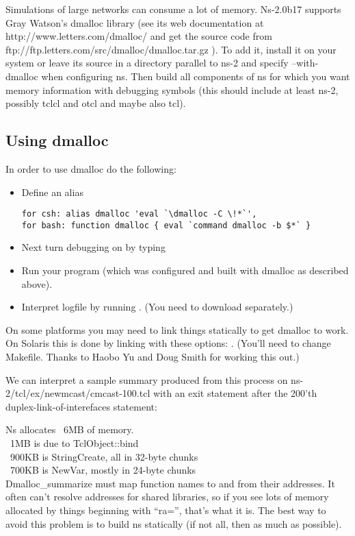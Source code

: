 Simulations of large networks can consume a lot of memory. Ns-2.0b17
supports Gray Watson's dmalloc library (see its web documentation at
http://www.letters.com/dmalloc/ and get the source code from
ftp://ftp.letters.com/src/dmalloc/dmalloc.tar.gz ).
To add it, install it on your system or leave its source in
a directory parallel to ns-2 and specify --with-dmalloc when configuring
ns. Then build all components of ns for which you want memory information
with debugging symbols (this should include at least ns-2, possibly tclcl
and otcl and maybe also tcl). 


\subsection{Using dmalloc}
\label{sec:usedmalloc}

In order to use dmalloc do the following:
\begin{itemize}
\item Define an alias 
\begin{verbatim}
for csh: alias dmalloc 'eval `\dmalloc -C \!*`', 
for bash: function dmalloc { eval `command dmalloc -b $*` }
\end{verbatim}
\item Next turn debugging on by typing 
\item Run your program (which was configured and built with dmalloc as
described above). 
\item Interpret logfile by running .
(You need to download  separately.) 
\end{itemize}

On some platforms you may need to link things statically to get dmalloc to
work. On Solaris this is done by linking with these options:
. (You'll need to change Makefile. Thanks to
Haobo Yu and Doug Smith for working this out.) 

We can interpret a sample summary produced from this process on
ns-2/tcl/ex/newmcast/cmcast-100.tcl with an exit statement after the
200'th duplex-link-of-interefaces statement: 

Ns allocates ~6MB of memory. \\
~1MB is due to TclObject::bind \\
~900KB is StringCreate, all in 32-byte chunks \\
~700KB is NewVar, mostly in 24-byte chunks \\
Dmalloc\_summarize must map function names to and from their addresses. It
often can't resolve addresses for shared libraries, so if you see lots of
memory allocated by things beginning with ``ra='', that's what it is. The
best way to avoid this problem is to build ns statically (if not all, then
as much as possible). 

